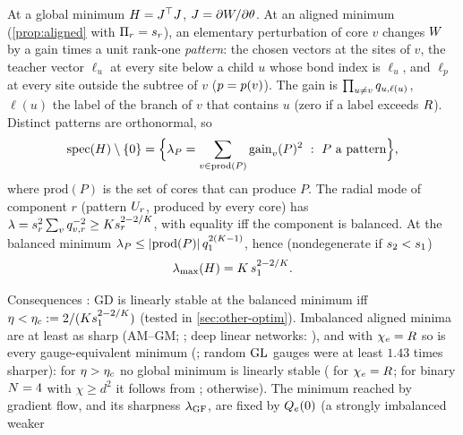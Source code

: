 \begin{proposition}\label{prop:A-pattern-rule}
  \proven{} \knownresult[binary $\Ns=4$ is a depth-3 linear network: spectrum for square layers,
  \citealp{ghosh2025learning}, Lemma~1; top eigenvalue at the flattest minimum, \citealp{mulayoff2020unique},
  Thm~1; new: general trees]
  At a global minimum $H=J^{\top} J$, $J=\partial W/\partial\theta$. At an aligned minimum (\cref{prop:aligned}
  with $\Pi_{r}=s_{r}$), an elementary perturbation of core $v$ changes $W$ by a gain times a unit rank-one
  \emph{pattern}: the chosen vectors at the sites of $v$, the teacher vector $\ell_u$ at every site below a
  child $u$ whose bond index is $\ell_u$, and $\ell_p$ at every site outside the subtree of $v$ ($p=p(v)$). The gain is
  $\prod_{u\ne v}q_{u,\ell(u)}$, $\ell(u)$ the label of the branch of $v$ that contains $u$ (zero if a label
  exceeds $R$). Distinct patterns are orthonormal, so
  \begin{equation}\label{eq:A-pattern-rule}
    \mathrm{spec}(\Hess)\setminus\{0\}=\Big\{\lambda_P=\sum_{v\in\mathrm{prod}(P)}\mathrm{gain}_v(P)^2\ :\ P\text{ a pattern}\Big\},
  \end{equation}
  where $\mathrm{prod}(P)$ is the set of cores that can produce $P$. The radial mode of component $r$ (pattern
  $U_{r}$, produced by every core) has $\lambda=s_{r}^2\sum_vq_{v,r}^{-2}\ge Ks_{r}^{2-2/K}$, with equality iff the
  component is balanced. At the balanced minimum $\lambda_P\le\lvert\mathrm{prod}(P)\rvert\,q_1^{2(K-1)}$, hence (nondegenerate if $s_{2}<s_{1}$)
  \begin{equation}\label{eq:A-sharpness}
    \lambda_{\max}(H)=K\,s_{1}^{2-2/K}.
  \end{equation}
\end{proposition}
Consequences \derived{} : GD
is linearly stable at the balanced minimum iff
$\eta<\eta_c:=2/(Ks_{1}^{2-2/K})$ (tested in \cref{sec:other-optim}). Imbalanced aligned minima are at least as
sharp (AM--GM; \proven; deep linear networks: \citealp{mulayoff2020unique}), and with $\chi_{e}=R$ so is every
gauge-equivalent minimum (\derived; random $\operatorname{GL}$ gauges were at least $1.43$ times sharper): for $\eta>\eta_c$ no
global minimum is linearly stable (\derived{} for $\chi_{e}=R$; for binary $\Ns=4$ with $\chi\ge d^2$ it follows
from \citealp[Thm~1]{mulayoff2020unique}; \conjecture{} otherwise). The minimum
reached by gradient flow, and its sharpness $\lambda_{\rm GF}$, are fixed by $Q_{e}(0)$ (a strongly imbalanced weaker
